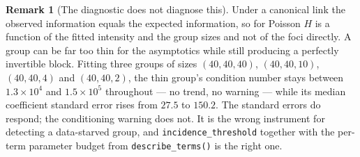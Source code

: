 \documentclass[11pt,a4paper]{article}
\theoremstyle{plain}
\theoremstyle{definition}
\newtheorem{remark}[proposition]{Remark}
\begin{document}
\begin{remark}[The diagnostic does not diagnose this]
Under a canonical link the observed information equals the expected information, so for Poisson
$H$ is a function of the fitted intensity and the group sizes and not of the foci directly. A
group can be far too thin for the asymptotics while still producing a perfectly invertible block.
Fitting three groups of sizes $(40,40,40)$, $(40,40,10)$, $(40,40,4)$ and $(40,40,2)$, the thin
group's condition number stays between $1.3\times10^{4}$ and $1.5\times10^{5}$ throughout ---
no trend, no warning --- while its median coefficient standard error rises from $27.5$ to
$150.2$. The standard errors do respond; the conditioning warning does not. It is the wrong
instrument for detecting a data-starved group, and \texttt{incidence\_threshold} together with
the per-term parameter budget from \texttt{describe\_terms()} is the right one.
\end{remark}

\clearpage

\end{document}
